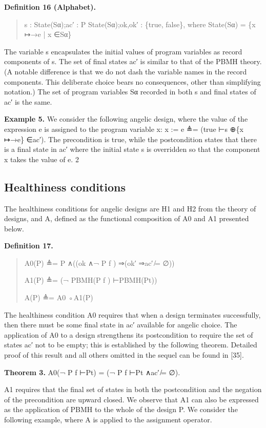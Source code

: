 \documentclass[11pt]{article}
\begin{document}
\noindent\textbf{Definition 16 (Alphabet).}


\begin{quote}\small\raggedright
s : State(Sα);ac′ : P State(Sα);ok,ok′ : \{true, false\}, where State(Sα) = \{x ↦→e | x ∈Sα\}
\end{quote}

The variable s encapsulates the initial values of program variables as record components of s. The set of final states ac′ is similar to that of the PBMH theory. (A notable difference is that we do not dash the variable names in the record components. This deliberate choice bears no consequences, other than simplifying notation.) The set of program variables Sα recorded in both s and final states of ac′ is the same.

\noindent\textbf{Example 5.} We consider the following angelic design, where the value of the expression e is assigned to the program variable x: x := e ≜= (true ⊢s ⊕\{x ↦→e\} ∈ac′). The precondition is true, while the postcondition states that there is a final state in ac′ where the initial state s is overridden so that the component x takes the value of e. 2


\subsection{Healthiness conditions}
The healthiness conditions for angelic designs are H1 and H2 from the theory of designs, and A, defined as the functional composition of A0 and A1 presented below.

\noindent\textbf{Definition 17.}


\begin{quote}\small\raggedright
A0(P) ≜= P ∧((ok ∧¬ P f ) ⇒(ok′ ⇒ac′ ̸= ∅))
\par
A1(P) ≜= (¬ PBMH(P f ) ⊢PBMH(Pt))
\par
A(P) ≜= A0 ◦A1(P)
\end{quote}

The healthiness condition A0 requires that when a design terminates successfully, then there must be some final state in ac′ available for angelic choice. The application of A0 to a design strengthens its postcondition to require the set of states ac′ not to be empty; this is established by the following theorem. Detailed proof of this result and all others omitted in the sequel can be found in [35].

\noindent\textbf{Theorem 3.} A0(¬ P f ⊢Pt) = (¬ P f ⊢Pt ∧ac′ ̸= ∅).


A1 requires that the final set of states in both the postcondition and the negation of the precondition are upward closed. We observe that A1 can also be expressed as the application of PBMH to the whole of the design P. We consider the following example, where A is applied to the assignment operator.
\end{document}
